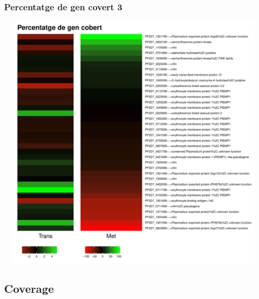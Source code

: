 \documentclass{article}\usepackage[]{graphicx}\usepackage[]{color}
\newenvironment{knitrout}{}{} %
\begin{document}
\subsubsection{Percentatge de gen covert 3}
\begin{knitrout}
\color{fgcolor}

{\centering \includegraphics[width=20cm,height=12.5cm]{figure/minimal-met_percet_3-1} 

}



\end{knitrout}
\clearpage

\subsection{Coverage}
\end{document}
